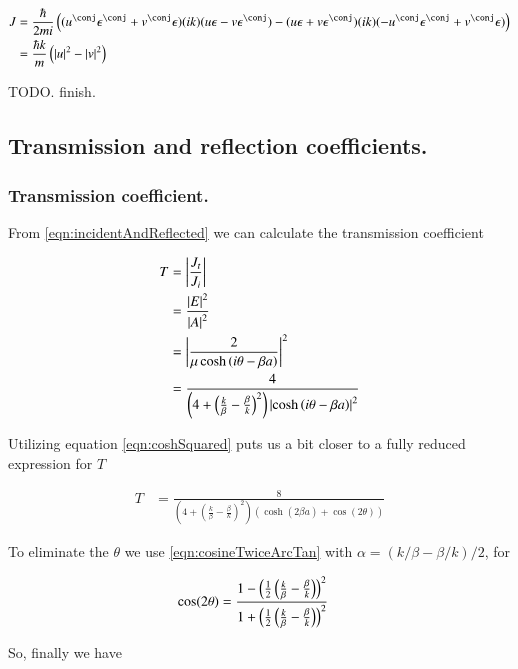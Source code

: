 \documentclass{article}
\begin{document}
\begin{align*}
J &=
\frac{\hbar}{2mi}\left(
(u^\conj \epsilon^\conj + v^\conj \epsilon)
(i k )
(u \epsilon - v \epsilon^\conj)
-
(u \epsilon + v \epsilon^\conj)
(i k )
(-u^\conj \epsilon^\conj + v^\conj \epsilon) 
\right)
\\
&=
\frac{\hbar k}{m}\left( \Abs{u}^2 - \Abs{v}^2 \right)
\end{align*}

TODO. finish.

\subsection{ Transmission and reflection coefficients. }

\subsubsection{ Transmission coefficient. }

From \ref{eqn:incidentAndReflected} we can calculate the transmission
coefficient

\begin{align*}
T 
&= \left\lvert{\frac{J_t}{J_i}}\right\rvert \\
&= \frac{\left\lvert{E}\right\rvert^2}{\left\lvert{A}\right\rvert^2} \\
&= \left\lvert{\frac{2  } { \mu \cosh\left( i\theta -\beta a \right) }}\right\rvert^2 \\
&= \frac{4} { 
\left(4 + \left( \frac{k}{\beta} -\frac{\beta}{k} \right)^2 \right)
\left\lvert{\cosh\left( i\theta -\beta a \right)}\right\rvert^2 }
\end{align*}

Utilizing equation \ref{eqn:coshSquared}
puts us a bit closer to a fully reduced expression for $T$

\begin{align*}
T 
&= \frac{8} { 
\left(4 + \left( \frac{k}{\beta} -\frac{\beta}{k} \right)^2 \right)
\left( \cosh(2\beta a) + \cos(2\theta) \right)
}
\end{align*}

To eliminate the $\theta$ we use \ref{eqn:cosineTwiceArcTan}
with $\alpha = ({k}/{\beta} - {\beta}/{k} )/2$, for

\begin{align*}
\cos(2\theta) 
&= 
\frac{ 1 - \left(\frac{1}{2} \left(\frac{k}{\beta} - \frac{\beta}{k} \right)\right)^2 }
{1 + \left(\frac{1}{2} \left(\frac{k}{\beta} - \frac{\beta}{k} \right)\right)^2}
\end{align*}

So, finally we have
\end{document}
